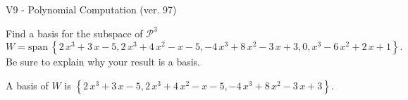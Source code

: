 \begin{exercise}
  \begin{exerciseTitle}V9 - Polynomial Computation (ver. 97)\end{exerciseTitle}
  \begin{exerciseStatement}
    Find a basis for the subspace of \(\mathcal{P}^3\) 
\[W=\mathrm{span}\ \left\{2 \, x^{3} + 3 \, x - 5 , 2 \, x^{3} + 4 \, x^{2} - x - 5 , -4 \, x^{3} + 8 \, x^{2} - 3 \, x + 3 , 0 , x^{3} - 6 \, x^{2} + 2 \, x + 1\right\}.\]
 Be sure to explain why your result is a basis.


  \end{exerciseStatement}
  \begin{exerciseAnswer}
   A basis of \(W\) is  \(\left\{2 \, x^{3} + 3 \, x - 5 , 2 \, x^{3} + 4 \, x^{2} - x - 5 , -4 \, x^{3} + 8 \, x^{2} - 3 \, x + 3\right\}\).
  


  \end{exerciseAnswer}
\end{exercise}